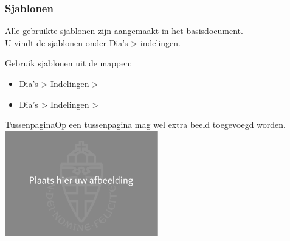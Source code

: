 \documentclass[xcolor=table,10pt,t]{beamer}
\begin{document}
\begin{frame}
    \frametitle{Sjablonen}
    
    \begin{block}{}
        Alle gebruikte sjablonen zijn aangemaakt in het basisdocument. \\
        U vindt de sjablonen onder Dia's > indelingen.
    \end{block}

    \begin{block}{}
        Gebruik sjablonen uit de mappen:
        \begin{itemize}
            \item Dia's > Indelingen > 
            \item Dia's > Indelingen > 
        \end{itemize}
    \end{block}
    \vspace{1em}


\end{frame}

\begin{tussenpagina}{Tussenpagina}{Op een tussenpagina mag wel extra beeld toegevoegd worden.}
        \includegraphics[width=0.5\textwidth]{image.png}
\end{tussenpagina}
\end{document}
